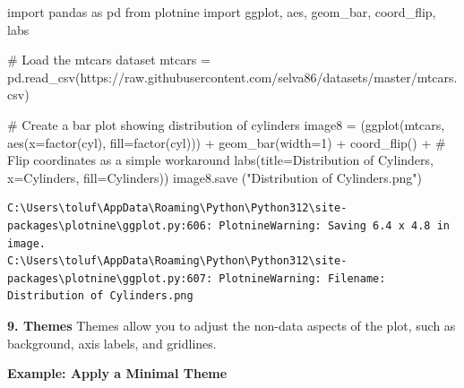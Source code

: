 \documentclass[
  letterpaper,
  DIV=11,
  numbers=noendperiod]{scrreprt}
\newenvironment{Shaded}{\begin{snugshade}}{\end{snugshade}}
\newcommand{\CommentTok}[1]{\textcolor[rgb]{0.37,0.37,0.37}{#1}}
\newcommand{\DecValTok}[1]{\textcolor[rgb]{0.68,0.00,0.00}{#1}}
\newcommand{\ImportTok}[1]{\textcolor[rgb]{0.00,0.46,0.62}{#1}}
\newcommand{\NormalTok}[1]{\textcolor[rgb]{0.00,0.23,0.31}{#1}}
\newcommand{\OperatorTok}[1]{\textcolor[rgb]{0.37,0.37,0.37}{#1}}
\newcommand{\StringTok}[1]{\textcolor[rgb]{0.13,0.47,0.30}{#1}}
\begin{document}
\begin{Shaded}
\begin{Highlighting}[]
\ImportTok{import}\NormalTok{ pandas }\ImportTok{as}\NormalTok{ pd}
\ImportTok{from}\NormalTok{ plotnine }\ImportTok{import}\NormalTok{ ggplot, aes, geom\_bar, coord\_flip, labs}

\CommentTok{\# Load the mtcars dataset}
\NormalTok{mtcars }\OperatorTok{=}\NormalTok{ pd.read\_csv(}\StringTok{\textquotesingle{}https://raw.githubusercontent.com/selva86/datasets/master/mtcars.csv\textquotesingle{}}\NormalTok{)}

\CommentTok{\# Create a bar plot showing distribution of cylinders}
\NormalTok{image8 }\OperatorTok{=}\NormalTok{ (ggplot(mtcars, aes(x}\OperatorTok{=}\StringTok{\textquotesingle{}factor(cyl)\textquotesingle{}}\NormalTok{, fill}\OperatorTok{=}\StringTok{\textquotesingle{}factor(cyl)\textquotesingle{}}\NormalTok{)) }\OperatorTok{+}
\NormalTok{ geom\_bar(width}\OperatorTok{=}\DecValTok{1}\NormalTok{) }\OperatorTok{+}
\NormalTok{ coord\_flip() }\OperatorTok{+}  \CommentTok{\# Flip coordinates as a simple workaround}
\NormalTok{ labs(title}\OperatorTok{=}\StringTok{\textquotesingle{}Distribution of Cylinders\textquotesingle{}}\NormalTok{,}
\NormalTok{      x}\OperatorTok{=}\StringTok{\textquotesingle{}Cylinders\textquotesingle{}}\NormalTok{,}
\NormalTok{      fill}\OperatorTok{=}\StringTok{\textquotesingle{}Cylinders\textquotesingle{}}\NormalTok{))}
\NormalTok{image8.save (}\StringTok{"Distribution of Cylinders.png"}\NormalTok{)}
\end{Highlighting}
\end{Shaded}

\begin{verbatim}
C:\Users\toluf\AppData\Roaming\Python\Python312\site-packages\plotnine\ggplot.py:606: PlotnineWarning: Saving 6.4 x 4.8 in image.
C:\Users\toluf\AppData\Roaming\Python\Python312\site-packages\plotnine\ggplot.py:607: PlotnineWarning: Filename: Distribution of Cylinders.png
\end{verbatim}

\textbf{9. Themes} Themes allow you to adjust the non-data aspects of
the plot, such as background, axis labels, and gridlines.

\textbf{Example: Apply a Minimal Theme}
\end{document}
